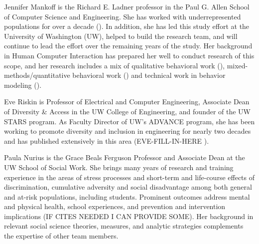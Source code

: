 Jennifer Mankoff is the Richard E. Ladner professor in the Paul G. Allen School of Computer Science and Engineering. She has worked with underrepresented populations for over a decade (\eg \cite{newman2004perceptions,DBLP:conf/huc/DillahuntMPF09,DBLP:conf/cscw/DillahuntM14,DBLP:conf/huc/DillahuntMP10,DBLP:journals/pacmhci/EarlyHHRWM18,DBLP:conf/chi/OLearyZMR19}). In addition, she has led this study effort at the University of Washington (UW), helped to build the research team, and will continue to lead the effort over the remaining years of the study. Her background in Human Computer Interaction has prepared her well to conduct research of this scope, and her research includes a mix of qualitative behavioral work (\eg \cite{DBLP:conf/huc/DillahuntMPF09,DBLP:conf/chi/MankoffKKRW11}), mixed-methods/quantitative behavioral work (\eg \cite{DBLP:conf/ph/CrawfordGSAM14,DBLP:journals/pacmhci/EarlyHHRWM18}) and technical work in behavior modeling (\eg \cite{DBLP:conf/chi/BanovicBCMD16}). 
 
Eve Riskin is Professor of Electrical and Computer Engineering, Associate Dean of Diversity \& Access in the UW College of Engineering, and founder of the UW STARS program. As Faculty Director of UW's ADVANCE program, she has been working to promote diversity and inclusion in engineering for nearly two decades and has published extensively in this area (EVE-FILL-IN-HERE ).
 
Paula Nurius is the Grace Beals Ferguson Professor and Associate Dean at the UW School of Social Work. She brings many years of research and training experience in the areas of stress processes and short-term and life-course effects of discrimination, cumulative adversity and social disadvantage among both general and at-risk populations, including students. Prominent outcomes address mental and physical health, school experiences, and prevention and intervention implications (IF CITES NEEDED I CAN PROVIDE SOME). Her background in relevant social science theories, measures, and analytic strategies complements the expertise of other team members. 
